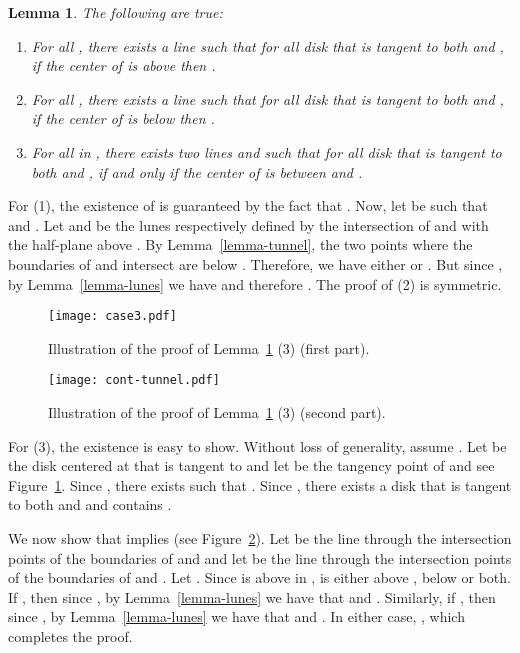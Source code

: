 \documentclass[pdftex,leqno,fleqn,12pt]{article}
\newtheorem{lemma}[theorem]{Lemma}
\newenvironment{proof}{{\textit Proof:} \rm}{\hfill  \medskip\\}
\begin{document}
\begin{lemma}\label{lemma-containment} The following are true:
\begin{enumerate}
\item For all , there exists a line  such that for all disk  that is tangent to both  and
, if the center of  is above  then .
\item For all , there exists a line  such that for all disk  that is tangent to both  and
, if the center of  is below  then .
\item For all  in , there exists two lines  and  such that for all disk  that is tangent to both  and
,  if and only if the center of  is between  and .
\end{enumerate}
\end{lemma}
\begin{proof}
For (1), the existence of  is guaranteed by the fact that . Now, let  be such that  and . Let  and  be
the lunes respectively defined by the intersection of  and  with the half-plane
above . By Lemma~\ref{lemma-tunnel}, the two points where the boundaries of  and
 intersect are below . Therefore, we have either  or
. But since , by Lemma~\ref{lemma-lunes} we have 
and therefore . The proof of (2) is symmetric.

\begin{figure}
\centering\texttt{[image: case3.pdf]}\caption{Illustration of the proof of
Lemma~\ref{lemma-containment} (3) (first part).} \label{fig-lemma-cont-tunnelb}
\end{figure}

\begin{figure}
\centering\texttt{[image: cont-tunnel.pdf]}\caption{Illustration of the proof of
Lemma~\ref{lemma-containment} (3) (second part).} \label{fig-lemma-cont-tunnel}
\end{figure}

For (3), the existence is easy to show. Without loss of generality, assume
.  Let  be the disk centered at  that is tangent to
 and let  be the tangency point of  and  see
Figure~\ref{fig-lemma-cont-tunnelb}. Since , there exists  such
that . Since , there exists a disk that is tangent
to both  and  and contains .

We now show that  implies  (see
Figure~\ref{fig-lemma-cont-tunnel}). Let  be the line through the intersection points of
the boundaries of  and  and let  be the line through the intersection
points of the boundaries of  and . Let . Since  is
above  in ,  is either above , below  or both. If
, then since , by Lemma~\ref{lemma-lunes} we have that
 and . Similarly, if
, then since , by Lemma~\ref{lemma-lunes} we have that
 and . In either case,
, which completes the proof.
\end{proof}
\end{document}
